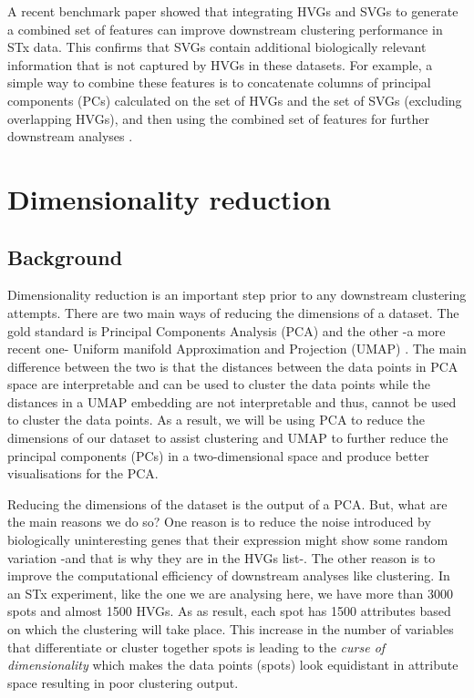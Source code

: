 \documentclass[
]{book}
\begin{document}
A recent benchmark paper \citep{Li2022Jan} showed that integrating HVGs and SVGs to generate a combined set of features can improve downstream clustering performance in STx data. This confirms that SVGs contain additional biologically relevant information that is not captured by HVGs in these datasets. For example, a simple way to combine these features is to concatenate columns of principal components (PCs) calculated on the set of HVGs and the set of SVGs (excluding overlapping HVGs), and then using the combined set of features for further downstream analyses \citep{Li2022Jan}.

\hypertarget{dimensionality-reduction}{%
\section{Dimensionality reduction}\label{dimensionality-reduction}}

\hypertarget{background-2}{%
\subsection{Background}\label{background-2}}

Dimensionality reduction is an important step prior to any downstream clustering attempts. There are two main ways of reducing the dimensions of a dataset. The gold standard is Principal Components Analysis (PCA) and the other -a more recent one- Uniform manifold Approximation and Projection (UMAP) \citep{McInnes2018Feb}. The main difference between the two is that the distances between the data points in PCA space are interpretable and can be used to cluster the data points while the distances in a UMAP embedding are not interpretable and thus, cannot be used to cluster the data points. As a result, we will be using PCA to reduce the dimensions of our dataset to assist clustering and UMAP to further reduce the principal components (PCs) in a two-dimensional space and produce better visualisations for the PCA.

Reducing the dimensions of the dataset is the output of a PCA. But, what are the main reasons we do so? One reason is to reduce the noise introduced by biologically uninteresting genes that their expression might show some random variation -and that is why they are in the HVGs list-. The other reason is to improve the computational efficiency of downstream analyses like clustering. In an STx experiment, like the one we are analysing here, we have more than 3000 spots and almost 1500 HVGs. As as result, each spot has 1500 attributes based on which the clustering will take place. This increase in the number of variables that differentiate or cluster together spots is leading to the \emph{curse of dimensionality} \citep{Keogh2017Apr} which makes the data points (spots) look equidistant in attribute space resulting in poor clustering output.
\end{document}
